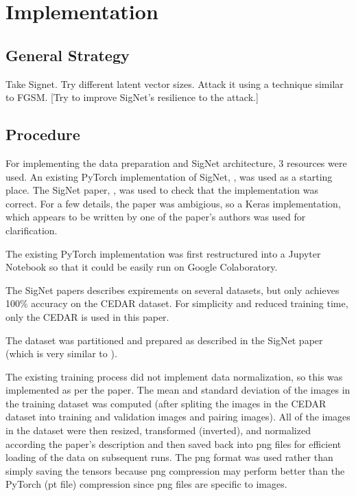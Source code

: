 \section{Implementation}\label{sec:implementation}


\subsection{General Strategy}

Take Signet.
Try different latent vector sizes.
Attack it using a technique similar to FGSM.
[Try to improve SigNet's resilience to the attack.]


\subsection{Procedure}

For implementing the data preparation and SigNet architecture, 3 resources were used.
An existing PyTorch implementation of SigNet, \cite{GitHub_signet_pytorch}, was used as a starting place.
The SigNet paper, \cite{sig_net}, was used to check that the implementation was correct.
For a few details, the paper was ambigious, so a Keras implementation, \cite{GitHub_sounakdey} which appears to be written by one of the paper's authors was used for clarification.

The existing PyTorch implementation was first restructured into a Jupyter Notebook so that it could be easily run on Google Colaboratory.

The SigNet papers describes expirements on several datasets, but only achieves 100\% accuracy on the CEDAR dataset.
For simplicity and reduced training time, only the CEDAR is used in this paper.

The dataset was partitioned and prepared as described in the SigNet paper (which is very similar to \cite{LeCun}).

The existing training process did not implement data normalization, so this was implemented as per the paper.
The mean and standard deviation of the images in the training dataset was computed (after spliting the images in the CEDAR dataset into training and validation images and pairing images).
All of the images in the dataset were then resized, transformed (inverted), and normalized according the paper's description and then saved back into png files for efficient loading of the data on subsequent runs.
The png format was used rather than simply saving the tensors because png compression may perform better than the PyTorch (pt file) compression since png files are specific to images.

